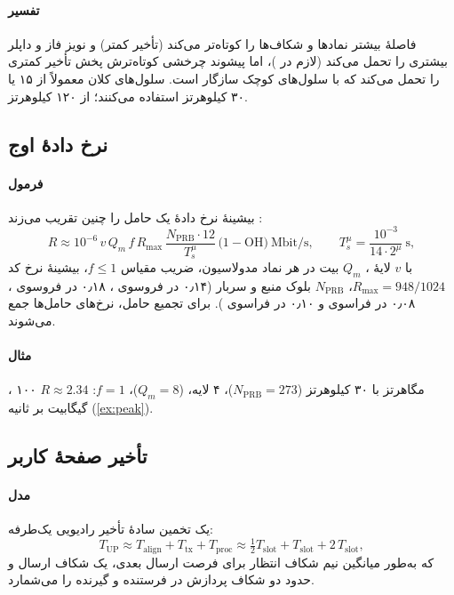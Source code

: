 \documentclass[11pt,a4paper]{article}
\begin{document}
\paragraph{تفسیر} فاصلهٔ بیشتر نمادها و شکاف‌ها را کوتاه‌تر می‌کند (تأخیر کمتر) و نویز فاز و داپلر بیشتری را تحمل می‌کند (لازم در
)، اما پیشوند چرخشی کوتاه‌ترش پخش تأخیر کمتری را تحمل می‌کند که با سلول‌های کوچک سازگار است. سلول‌های کلان
 معمولاً از ۱۵ یا ۳۰ کیلوهرتز استفاده می‌کنند؛  از ۱۲۰ کیلوهرتز.

\subsection{نرخ دادهٔ اوج}\label{sec:peak}
\paragraph{فرمول}  بیشینهٔ نرخ دادهٔ یک حامل را چنین تقریب می‌زند \cite{ts38306}:
\begin{equation}\label{eq:peak}
  R \approx 10^{-6}\, v\, Q_m\, f\, R_{\max}\,
          \frac{N_{\mathrm{PRB}}\cdot 12}{T_s^{\mu}}\,\bigl(1-\mathrm{OH}\bigr)\ \text{Mbit/s},
  \qquad T_s^{\mu} = \frac{10^{-3}}{14\cdot2^{\mu}}\ \text{s},
\end{equation}
با $v$ لایهٔ ، $Q_m$ بیت در هر نماد مدولاسیون، ضریب مقیاس $f\le1$، بیشینهٔ نرخ کد $R_{\max} = 948/1024$،
$N_{\mathrm{PRB}}$ بلوک منبع و سربار  (۰٫۱۴ در فروسوی ، ۰٫۱۸ در فروسوی ، ۰٫۰۸ در فراسوی  و
۰٫۱۰ در فراسوی ). برای تجمیع حامل، نرخ‌های حامل‌ها جمع می‌شوند.
\paragraph{مثال} ، ۱۰۰ مگاهرتز با ۳۰ کیلوهرتز ($N_{\mathrm{PRB}} = 273$)، ۴ لایه،  ($Q_m = 8$)، $f = 1$:
$R \approx 2.34$ گیگابیت بر ثانیه (\cref{ex:peak}).

\subsection{تأخیر صفحهٔ کاربر}\label{sec:lat}
\paragraph{مدل} یک تخمین سادهٔ تأخیر رادیویی یک‌طرفه:
\begin{equation}\label{eq:latency}
  T_{\mathrm{UP}} \approx T_{\mathrm{align}} + T_{\mathrm{tx}} + T_{\mathrm{proc}}
  \approx \tfrac12 T_{\mathrm{slot}} + T_{\mathrm{slot}} + 2\,T_{\mathrm{slot}},
\end{equation}
که به‌طور میانگین نیم شکاف انتظار برای فرصت ارسال بعدی، یک شکاف ارسال و حدود دو شکاف پردازش در فرستنده و گیرنده را
می‌شمارد.
\end{document}

